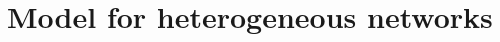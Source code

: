 \documentclass[12pt]{article}
\newcommand{\blue}[1]{\textcolor{blue}{#1}}
\begin{document}





\section{Model for heterogeneous networks }\label{sec:model}
\end{document}
